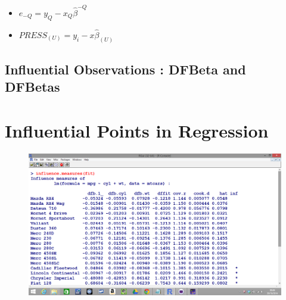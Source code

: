 \documentclass[residuals.tex]{subfiles}
\begin{document}
\begin{itemize}
	\item $e_{-Q} = y_{Q} - x_{Q}\hat{\beta}^{-Q}$
	\item $PRESS_{(U)} = y_{i} - x\hat{\beta}_{(U)}$
\end{itemize}


\newpage

\subsection{Influential Observations : DFBeta and DFBetas}



\newpage
	
\section{Influential Points in Regression}
 



\begin{figure}
\centering
\includegraphics[width=1.1\linewidth]{Screenshot2}
\caption{}
\label{fig:Screenshot2}
\end{figure}
\end{document}
